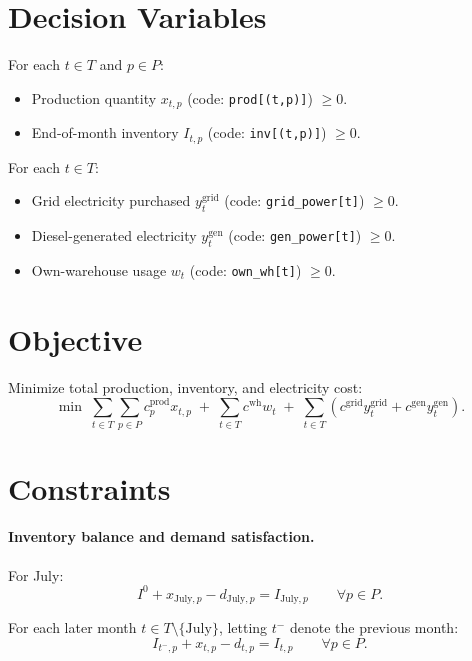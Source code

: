 \section*{Decision Variables}

For each \(t\in T\) and \(p\in P\):

\begin{itemize}
    \item Production quantity \(x_{t,p}\) (code: \texttt{prod[(t,p)]}) \(\ge 0\).
    \item End-of-month inventory \(I_{t,p}\) (code: \texttt{inv[(t,p)]}) \(\ge 0\).
\end{itemize}

For each \(t\in T\):

\begin{itemize}
    \item Grid electricity purchased \(y_t^{\text{grid}}\) (code: \texttt{grid\_power[t]}) \(\ge 0\).
    \item Diesel-generated electricity \(y_t^{\text{gen}}\) (code: \texttt{gen\_power[t]}) \(\ge 0\).
    \item Own-warehouse usage \(w_t\) (code: \texttt{own\_wh[t]}) \(\ge 0\).
\end{itemize}

\section*{Objective}

Minimize total production, inventory, and electricity cost:
\[
\min \;
\sum_{t\in T}\sum_{p\in P} c^{\text{prod}}_p x_{t,p}
\;+\;
\sum_{t\in T} c^{\text{wh}} w_t
\;+\;
\sum_{t\in T}\left(c^{\text{grid}} y_t^{\text{grid}} + c^{\text{gen}} y_t^{\text{gen}}\right).
\]

\section*{Constraints}

\paragraph{Inventory balance and demand satisfaction.}
For July:
\[
I^0 + x_{\text{July},p} - d_{\text{July},p} = I_{\text{July},p}
\qquad \forall p\in P.
\]

For each later month \(t\in T\setminus\{\text{July}\}\), letting \(t^{-}\) denote the previous month:
\[
I_{t^{-},p} + x_{t,p} - d_{t,p} = I_{t,p}
\qquad \forall p\in P.
\]

